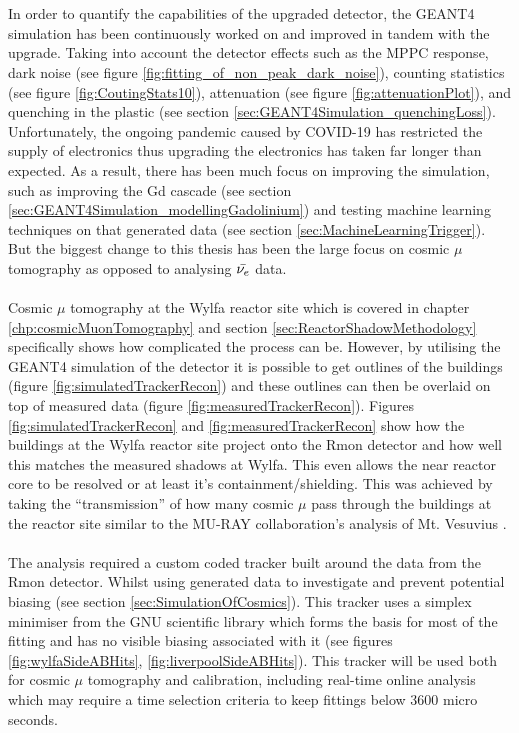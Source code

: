 \\\\In order to quantify the capabilities of the upgraded detector, the GEANT4 simulation has been continuously worked on and improved in tandem with the upgrade. Taking into account the detector effects such as the MPPC response, dark noise (see figure \ref{fig:fitting_of_non_peak_dark_noise}), counting statistics (see figure \ref{fig:CoutingStats10}), attenuation (see figure \ref{fig:attenuationPlot}), and quenching in the plastic (see section \ref{sec:GEANT4Simulation_quenchingLoss}). Unfortunately, the ongoing pandemic caused by COVID-19 has restricted the supply of electronics thus upgrading the electronics has taken far longer than expected. As a result, there has been much focus on improving the simulation, such as improving the Gd cascade (see section \ref{sec:GEANT4Simulation_modellingGadolinium}) and testing machine learning techniques on that generated data (see section \ref{sec:MachineLearningTrigger}). But the biggest change to this thesis has been the large focus on cosmic $\mu$ tomography as opposed to analysing $\Bar{\nu_e}$ data.
\\\\Cosmic $\mu$ tomography at the Wylfa reactor site which is covered in chapter  \ref{chp:cosmicMuonTomography} and section \ref{sec:ReactorShadowMethodology} specifically shows how complicated the process can be. However, by utilising the GEANT4 simulation of the detector it is possible to get outlines of the buildings (figure \ref{fig:simulatedTrackerRecon}) and these outlines can then be overlaid on top of measured data (figure \ref{fig:measuredTrackerRecon}). Figures \ref{fig:simulatedTrackerRecon} and \ref{fig:measuredTrackerRecon} show how the buildings at the Wylfa reactor site project onto the Rmon detector and how well this matches the measured shadows at Wylfa. This even allows the near reactor core to be resolved or at least it's containment/shielding. This was achieved by taking the ``transmission'' of how many cosmic $\mu$ pass through the buildings at the reactor site similar to the  MU-RAY collaboration's analysis of Mt. Vesuvius \cite{Ambrosino_2014}.    
\\\\The analysis required a custom coded tracker built around the data from the Rmon detector. Whilst using generated data to investigate and prevent potential biasing (see section \ref{sec:SimulationOfCosmics}). This tracker uses a simplex minimiser from the GNU scientific library \cite{galassi2002gnu} which forms the basis for most of the fitting and has no visible biasing associated with it (see figures \ref{fig:wylfaSideABHits}, \ref{fig:liverpoolSideABHits}). This tracker will be used both for cosmic $\mu$ tomography and calibration, including real-time online analysis which may require a time selection criteria to keep fittings below 3600 micro seconds. 
